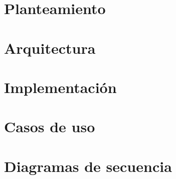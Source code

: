 \section{Planteamiento}


\section{Arquitectura}


\section{Implementación}


\newpage
\section{Casos de uso}


\newpage
\section{Diagramas de secuencia}


        
